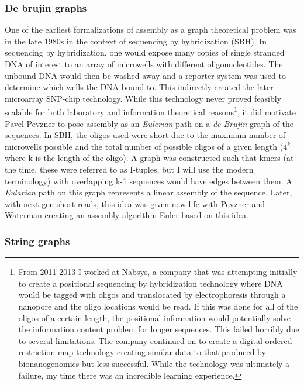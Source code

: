 \subsubsection{De brujin graphs}
\par{
One of the earliest formalizations of assembly as a graph theoretical problem was in the late 1980s in the context of sequencing by hybridization (SBH)\cite{SBH}. In sequencing by hybridization, one would expose many copies of single stranded DNA of interest to an array of microwells with different oligonucleotides. The unbound DNA would then be washed away and a reporter system was used to determine which wells the DNA bound to. This indirectly created the later microarray SNP-chip technology. While this technology never proved feasibly scalable for both laboratory and information theoretical reasons\cite{Preparata}\footnote{From 2011-2013 I worked at Nabsys, a company that was attempting initially to create a positional sequencing by hybridization\cite{positionalSBH} technology where DNA would be tagged with oligos and translocated by electrophoresis through a nanopore and the oligo locations would be read. If this was done for all of the oligos of a certain length, the positional information would potentially solve the information content problem for longer sequences. This failed horribly due to several limitations. The company continued on to create a digital ordered restriction map technology\cite{nabsyspatent} creating similar data to that produced by bionanogenomics but less successful. While the technology was ultimately a failure, my time there was an incredible learning experience.}, it did motivate Pavel Pevzner to pose assembly as an \textit{Eulerian} path on a \textit{de Brujin} graph of the sequences. In SBH, the oligos used were short due to the maximum number of microwells possible and the total number of possible oligos of a given length ($4^{k}$ where k is the length of the oligo). A graph was constructed such that kmers (at the time, these were referred to as I-tuples, but I will use the modern terminology) with overlapping k-1 sequences would have edges between them. A \textit{Eularian} path on this graph represents a linear assembly of the sequence. Later, with next-gen short reads, this idea was given new life with Pevzner and Waterman\cite{Pevzner2001} creating an assembly algorithm Euler based on this idea.
}

\subsubsection{String graphs}

